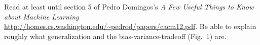 










Read at least until section 5 of Pedro Domingos's \emph{A Few Useful
Things to Know about Machine Learning}
{\tiny\url{http://homes.cs.washington.edu/~pedrod/papers/cacm12.pdf}}. 
Be able to explain roughly what generalization and the bias-variance-tradeoff
(Fig.\ 1) are.






\exerfoot

